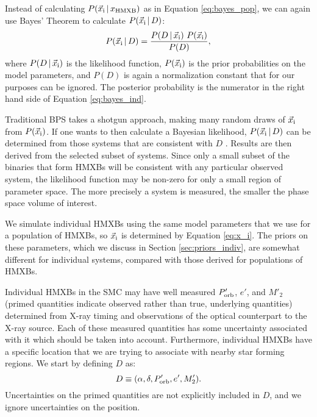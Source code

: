 \documentclass[usenatbib]{mnras}
\newcommand{\given}{\,|\,}
\begin{document}
Instead of calculating $P(\vec{x}_{\rm i} \given x_{\rm HMXB})$ as in Equation \ref{eq:bayes_pop}, we can again use Bayes' Theorem to calculate $P(\vec{x}_{\rm i} \given D)$:
\begin{equation}
P(\vec{x}_{\rm i} \given D) = \frac{P(D \given \vec{x}_{\rm i})\ P(\vec{x}_{\rm i})}{P(D)}, \label{eq:bayes_ind}
\end{equation}
where $P(D \given \vec{x}_{\rm i})$ is the likelihood function, $P(\vec{x}_{\rm i})$ is the prior probabilities on the model parameters, and $P(D)$ is again a normalization constant that for our purposes can be ignored. The posterior probability is the numerator in the right hand side of Equation \ref{eq:bayes_ind}.



Traditional BPS takes a shotgun approach, making many random draws of $\vec{x}_{\rm i}$ from $P(\vec{x}_{\rm i})$. If one wants to then calculate a Bayesian likelihood, $P(\vec{x}_{\rm i} \given D)$ can be determined from those systems that are consistent with $D$ \citep{andrews15}. Results are then derived from the selected subset of systems. Since only a small subset of the binaries that form HMXBs will be consistent with any particular observed system, the likelihood function may be non-zero for only a small region of parameter space. The more precisely a system is measured, the smaller the phase space volume of interest. 






We simulate individual HMXBs using the same model parameters that we use for a population of HMXBs, so $\vec{x}_{\rm i}$ is determined by Equation \ref{eq:x_i}. The priors on these parameters, which we discuss in Section \ref{sec:priors_indiv}, are somewhat different for individual systems, compared with those derived for populations of HMXBs.

Individual HMXBs in the SMC may have well measured $P'_{\rm orb}$, $e'$, and $M'_2$ (primed quantities indicate observed rather than true, underlying quantities) determined from X-ray timing and observations of the optical counterpart to the X-ray source. Each of these measured quantities has some uncertainty associated with it which should be taken into account. Furthermore, individual HMXBs have a specific location that we are trying to associate with nearby star forming regions. We start by defining $D$ as:
\begin{equation}
D \equiv (\alpha, \delta, P'_{\rm orb}, e', M'_2). \label{eq:D}
\end{equation}
Uncertainties on the primed quantities are not explicitly included in $D$, and we ignore uncertainties on the position.
\end{document}
